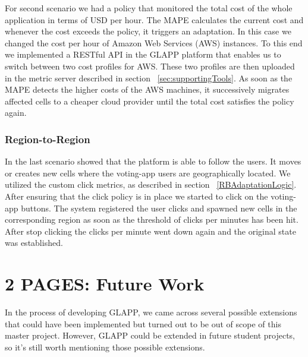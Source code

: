 \documentclass{seal_thesis}
\begin{document}
For second scenario we had a policy that monitored the total cost of the whole application in terms of USD per hour.
The MAPE calculates the current cost and whenever the cost exceeds the policy, it triggers an adaptation.
In this case we changed the cost per hour of Amazon Web Services (AWS) instances.
To this end we implemented a RESTful API in the GLAPP platform that enables us to switch between two cost profiles for AWS.
These two profiles are then uploaded in the metric server described in section ~\ref{sec:supportingTools}.
As soon as the MAPE detects the higher costs of the AWS machines, it successively migrates affected cells to a cheaper cloud provider until the total cost satisfies the policy again.

\subsection{Region-to-Region}
In the last scenario showed that the platform is able to follow the users.
It moves or creates new cells where the voting-app users are geographically located.
We utilized the custom click metrics, as described in section ~\ref{RBAdaptationLogic}.
After ensuring that the click policy is in place we started to click on the voting-app buttons.
The system registered the user clicks and spawned new cells in the corresponding region as soon as the threshold of clicks per minutes has been hit.
After stop clicking the clicks per minute went down again and the original state was established.


\chapter{2 PAGES: Future Work}\label{ch:futurework}

In the process of developing GLAPP, we came across several possible extensions that could have been implemented but turned out to be out of scope of this master project.
However, GLAPP could be extended in future student projects, so it's still worth mentioning those possible extensions.

\end{document}
